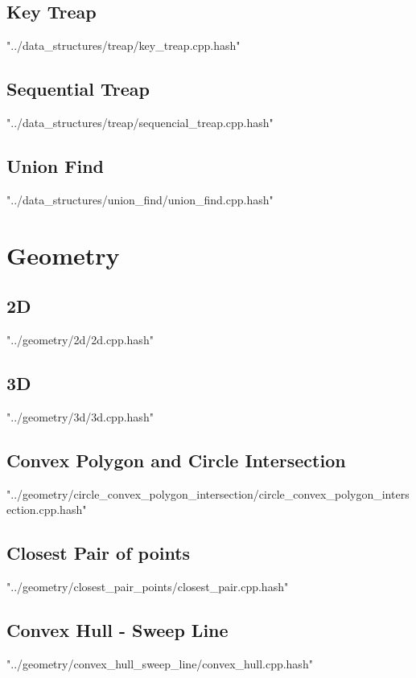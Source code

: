 \documentclass [5pt,twocolumn,oneside]{article}
\begin{document}
\begin{landscape}
\begin{multicols}{3}
\subsection{ Key Treap}
 {"../data_structures/treap/key_treap.cpp.hash"}


\subsection{ Sequential Treap}
 {"../data_structures/treap/sequencial_treap.cpp.hash"}


\subsection{ Union Find}
 {"../data_structures/union_find/union_find.cpp.hash"}



\section{Geometry}
\subsection{ 2D}
 {"../geometry/2d/2d.cpp.hash"}


\subsection{ 3D}
 {"../geometry/3d/3d.cpp.hash"}


\subsection{ Convex Polygon and Circle Intersection}
 {"../geometry/circle_convex_polygon_intersection/circle_convex_polygon_intersection.cpp.hash"}


\subsection{ Closest Pair of points}
 {"../geometry/closest_pair_points/closest_pair.cpp.hash"}


\subsection{ Convex Hull - Sweep Line}
 {"../geometry/convex_hull_sweep_line/convex_hull.cpp.hash"}



\end{multicols}
\end{landscape}
\end{document}
